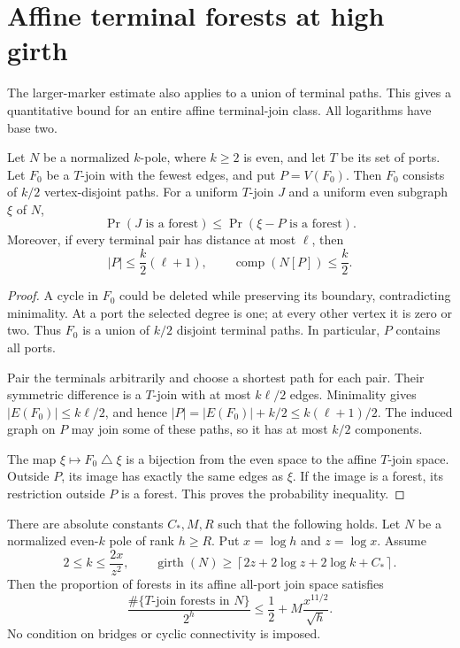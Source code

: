 \section{Affine terminal forests at high girth}
\label{sec:random-terminal-forest-girth}

The larger-marker estimate also applies to a union of terminal paths.
This gives a quantitative bound for an entire affine terminal-join class.
All logarithms have base two.

\begin{lemma}
\label{lem:random-terminal-forest-translation}
Let $N$ be a normalized $k$-pole, where $k\ge2$ is even, and let $T$ be its set of ports.
Let $F_0$ be a $T$-join with the fewest edges, and put $P=V(F_0)$.
Then $F_0$ consists of $k/2$ vertex-disjoint paths.
For a uniform $T$-join $J$ and a uniform even subgraph $\xi$ of $N$,
\[
 \Pr(J\text{ is a forest})
 \le\Pr(\xi-P\text{ is a forest}).
\]
Moreover, if every terminal pair has distance at most $\ell$, then
\[
 |P|\le\frac k2(\ell+1),\qquad
 \operatorname{comp}(N[P])\le\frac k2.
\]
\end{lemma}

\begin{proof}
A cycle in $F_0$ could be deleted while preserving its boundary, contradicting minimality.
At a port the selected degree is one; at every other vertex it is zero or two.
Thus $F_0$ is a union of $k/2$ disjoint terminal paths.
In particular, $P$ contains all ports.

Pair the terminals arbitrarily and choose a shortest path for each pair.
Their symmetric difference is a $T$-join with at most $k\ell/2$ edges.
Minimality gives $|E(F_0)|\le k\ell/2$, and hence
$|P|=|E(F_0)|+k/2\le k(\ell+1)/2$.
The induced graph on $P$ may join some of these paths, so it has at most $k/2$ components.

The map $\xi\mapsto F_0\mathbin\triangle\xi$ is a bijection from the even space to the affine $T$-join space.
Outside $P$, its image has exactly the same edges as $\xi$.
If the image is a forest, its restriction outside $P$ is a forest.
This proves the probability inequality.
\end{proof}

\begin{theorem}
\label{thm:random-terminal-forest-girth}
There are absolute constants $C_*,M,R$ such that the following holds.
Let $N$ be a normalized even-$k$ pole of rank $h\ge R$.
Put $x=\log h$ and $z=\log x$.
Assume
\[
 2\le k\le\frac{2x}{z^2},
 \qquad
 \operatorname{girth}(N)\ge
 \left\lceil2z+2\log z+2\log k+C_*\right\rceil.
\]
Then the proportion of forests in its affine all-port join space satisfies
\[
 \frac{\#\{T\text{-join forests in }N\}}{2^h}
 \le\frac12+M\frac{x^{11/2}}{\sqrt h}.
\]
No condition on bridges or cyclic connectivity is imposed.
\end{theorem}

